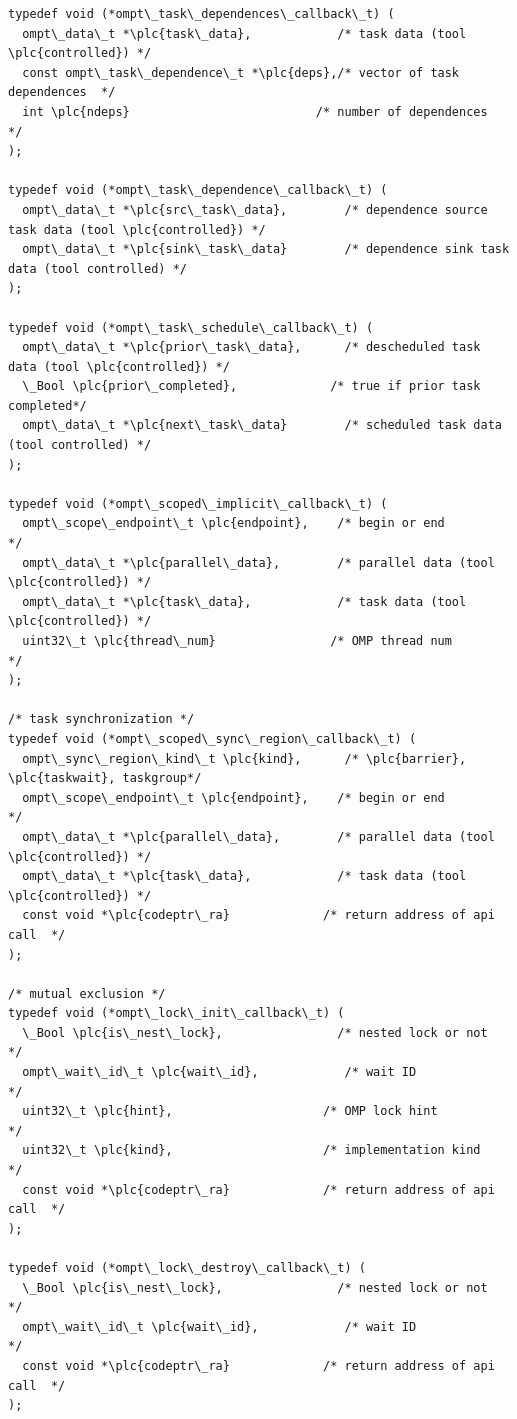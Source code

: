 \documentclass{article}
\begin{document}
\begin{boxedcode}
\begin{verbatim}
typedef void (*ompt\_task\_dependences\_callback\_t) (                                   
  ompt\_data\_t *\plc{task\_data},            /* task data (tool \plc{controlled}) */
  const ompt\_task\_dependence\_t *\plc{deps},/* vector of task dependences  */
  int \plc{ndeps}                          /* number of dependences       */
);

typedef void (*ompt\_task\_dependence\_callback\_t) (
  ompt\_data\_t *\plc{src\_task\_data},        /* dependence source task data (tool \plc{controlled}) */
  ompt\_data\_t *\plc{sink\_task\_data}        /* dependence sink task data (tool controlled) */
);

typedef void (*ompt\_task\_schedule\_callback\_t) (
  ompt\_data\_t *\plc{prior\_task\_data},      /* descheduled task data (tool \plc{controlled}) */
  \_Bool \plc{prior\_completed},             /* true if prior task completed*/
  ompt\_data\_t *\plc{next\_task\_data}        /* scheduled task data (tool controlled) */
);

typedef void (*ompt\_scoped\_implicit\_callback\_t) ( 
  ompt\_scope\_endpoint\_t \plc{endpoint},    /* begin or end                */
  ompt\_data\_t *\plc{parallel\_data},        /* parallel data (tool \plc{controlled}) */
  ompt\_data\_t *\plc{task\_data},            /* task data (tool \plc{controlled}) */
  uint32\_t \plc{thread\_num}                /* OMP thread num              */
);

/* task synchronization */
typedef void (*ompt\_scoped\_sync\_region\_callback\_t) ( 
  ompt\_sync\_region\_kind\_t \plc{kind},      /* \plc{barrier}, \plc{taskwait}, taskgroup*/
  ompt\_scope\_endpoint\_t \plc{endpoint},    /* begin or end                */ 
  ompt\_data\_t *\plc{parallel\_data},        /* parallel data (tool \plc{controlled}) */
  ompt\_data\_t *\plc{task\_data},            /* task data (tool \plc{controlled}) */
  const void *\plc{codeptr\_ra}             /* return address of api call  */
);

/* mutual exclusion */
typedef void (*ompt\_lock\_init\_callback\_t) (
  \_Bool \plc{is\_nest\_lock},                /* nested lock or not          */
  ompt\_wait\_id\_t \plc{wait\_id},            /* wait ID                     */
  uint32\_t \plc{hint},                     /* OMP lock hint               */
  uint32\_t \plc{kind},                     /* implementation kind         */
  const void *\plc{codeptr\_ra}             /* return address of api call  */
);

typedef void (*ompt\_lock\_destroy\_callback\_t) (
  \_Bool \plc{is\_nest\_lock},                /* nested lock or not          */
  ompt\_wait\_id\_t \plc{wait\_id},            /* wait ID                     */
  const void *\plc{codeptr\_ra}             /* return address of api call  */
);


\end{verbatim}
\end{boxedcode}
\end{document}
